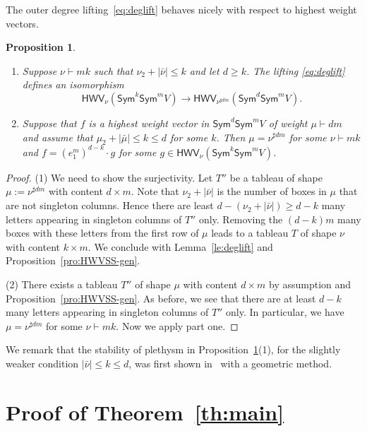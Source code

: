 \documentclass[11pt]{amsart}
\def\Sym{\mathsf{Sym}}
\newcommand{\HWV}{\mathsf{HWV}}
\numberwithin{equation}{section}
\newtheorem{proposition}[theorem]{Proposition}
\begin{document}
The outer degree lifting~\eqref{eq:deglift} behaves nicely with respect to highest weight vectors. 

\begin{proposition}\label{le:newlift}
\begin{enumerate}
\item Suppose $\nu\vdash mk$ such that 
$\nu_2 + |\bar{\nu}|\le k$ and let $d\ge k$. 
The lifting \eqref{eq:deglift} defines an isomorphism
\begin{equation*}%
 \HWV_{\nu}(\Sym^k \Sym^m V) \to \HWV_{\nu^{\sharp dm}}(\Sym^d \Sym^m V) .
\end{equation*}

\item Suppose that $f$ is a highest weight vector in $\Sym^d\Sym^m V$ of weight 
$\mu\vdash dm$ and assume that $\mu_2 +|\bar{\mu}| \le k\le d$ for some $k$. 
Then $\mu=\nu^{\sharp dm}$ for some $\nu\vdash mk$ and 
$f = (e_1^m)^{d-k} \cdot g$ for some $g\in \HWV_{\nu}(\Sym^k\Sym^m V)$. 
 
\end{enumerate}
\end{proposition}

\begin{proof} 
(1) We need to show the surjectivity. 
Let $T''$ be a tableau of shape $\mu :=\nu^{\sharp dm}$ with content $d\times m$. 
Note that $\nu_2 + |\bar{\nu}|$ is the number of boxes in $\mu$ that are not singleton columns.
Hence there are least
$d - (\nu_2 + |\bar{\nu}|) \ge d - k$ many letters appearing in singleton columns of $T''$ only.   
Removing the $(d-k)m$ many boxes with these letters from the first row of $\mu$ leads to 
a tableau $T$ of shape $\nu$ with content $k\times m$. We conclude with 
Lemma~\ref{le:deglift} and Proposition~\ref{pro:HWVSS-gen}.

(2) There exists a tableau $T''$ of shape $\mu$ with content $d\times m$ 
by assumption and Proposition~\ref{pro:HWVSS-gen}.
As before, we see that there are at least $d-k$ many letters 
appearing in singleton columns of $T''$ only.  
In particular, we have $\mu =\nu^{\sharp dm}$ for some $\nu\vdash mk$. 
Now we apply part one.
\end{proof}

We remark that the stability of plethysm in Proposition~\ref{le:newlift}(1),
for the slightly weaker condition $|\bar{\nu}| \le k \le d$,
was first shown in~\cite{mani:98} with a geometric method. 

\section{Proof of Theorem~\ref{th:main}}
\end{document}
